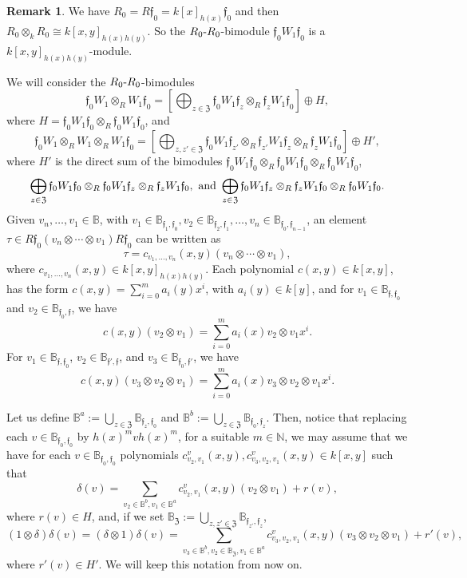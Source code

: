 \documentclass{article}
\theoremstyle{definition}
\newtheorem{remark}[theorem]{Remark}
\renewcommand{\frak}{\mathfrak}
\newcommand{\g}{\hbox{-}}
\newcommand{\hueca}[1]{\mathbb{#1}}
\begin{document}
\begin{remark}\label{R: descriptions of delta and}
 We have $R_0=R\frak{f}_0=k[x]_{h(x)}\frak{f}_0$ and then $R_0\otimes_kR_0\cong k[x,y]_{h(x)h(y)}$. So the $R_0\g R_0$-bimodule $\frak{f}_0W_1\frak{f}_0$ is a $k[x,y]_{h(x)h(y)}$-module.  

We will consider the $R_0\g R_0$-bimodules 
$$\frak{f}_0W_1\otimes_R W_1\frak{f}_0=[\bigoplus_{z\in \frak{Z}}\frak{f}_0W_1\frak{f}_z\otimes_R\frak{f}_zW_1\frak{f}_0]\oplus H, $$
where  $H=\frak{f}_0W_1\frak{f}_0\otimes_{R}\frak{f}_0W_1\frak{f}_0$,
 and 
$$\frak{f}_0W_1\otimes_RW_1\otimes_RW_1\frak{f}_0=
[\bigoplus_{z,z'\in \frak{Z}}\frak{f}_0W_1\frak{f}_{z'}\otimes_R\frak{f}_{z'}W_1\frak{f}_z\otimes_R \frak{f}_zW_1\frak{f}_0 ]\oplus H',$$
where $H'$ is the direct sum of the bimodules 
$
\frak{f}_0W_1\frak{f}_0\otimes_{R}\frak{f}_0W_1\frak{f}_0\otimes_{R}\frak{f}_0W_1\frak{f}_0$,  
$$\bigoplus_{z\in \frak{Z}}\frak{f}_0W_1\frak{f}_0\otimes_{R}\frak{f}_0W_1\frak{f}_z\otimes_R\frak{f}_zW_1\frak{f}_0,  
\hbox{ and }
\bigoplus_{z\in \frak{Z}}\frak{f}_0W_1\frak{f}_z\otimes_R\frak{f}_zW_1\frak{f}_0\otimes_{R}\frak{f}_0W_1\frak{f}_0.
$$ 
Given $v_n,\ldots,v_1\in \hueca{B}$, with $v_1\in \hueca{B}_{\frak{f}_1,\frak{f}_0}, v_2\in \hueca{B}_{\frak{f}_2,\frak{f}_1},\ldots, v_n\in \hueca{B}_{\frak{f}_0,\frak{f}_{n-1}}$, 
an element $\tau\in R\frak{f}_0(v_n\otimes\cdots\otimes v_1)R\frak{f}_0$ can be written as $$\tau=c_{v_1,\ldots,v_n}(x,y)(v_n\otimes\cdots\otimes v_1),$$
where  $c_{v_1,\ldots,v_n}(x,y)\in k[x,y]_{h(x)h(y)}$. Each polynomial $c(x,y)\in k[x,y]$, has the form $c(x,y)=\sum_{i=0}^ma_i(y)x^i$, with $a_i(y)\in k[y]$, and for $v_1\in \hueca{B}_{\frak{f},\frak{f}_0}$ and $v_2\in \hueca{B}_{\frak{f}_0,\frak{f}}$,  we have 
$$c(x,y)(v_2\otimes v_1)=\sum_{i=0}^ma_i(x)v_2\otimes v_1 x^i.$$
For $v_1\in \hueca{B}_{\frak{f},\frak{f}_0}$, $v_2\in \hueca{B}_{\frak{f}',\frak{f}}$, and $v_3\in \hueca{B}_{\frak{f}_0,\frak{f}'}$, we have 
$$c(x,y)(v_3\otimes v_2\otimes v_1)=\sum_{i=0}^ma_i(x)v_3\otimes v_2\otimes v_1 x^i.$$

Let us define  
$\hueca{B}^a:=\bigcup_{z\in \frak{Z}}
\hueca{B}_{\frak{f}_z,\frak{f}_0}$ and 
$\hueca{B}^b:=\bigcup_{z\in \frak{Z}}
\hueca{B}_{\frak{f}_0,\frak{f}_z}$. Then, notice that  replacing  each $v \in \hueca{B}_{\frak{f}_0,\frak{f}_0}$ by $h(x)^mvh(x)^m$, for a suitable $m\in \hueca{N}$, we may assume that we have  for each $v\in \hueca{B}_{\frak{f}_0,\frak{f}_0}$ polynomials $c^v_{v_2,v_1}(x,y), c^v_{v_3,v_2,v_1}(x,y)\in k[x,y]$ such that
$$\delta(v)=\sum_{v_2\in \hueca{B}^b, v_1\in \hueca{B}^a}c^v_{v_2,v_1}(x,y)(v_2\otimes v_1)+r(v),$$
where $r(v)\in H$, and, if we set $\hueca{B}_{\frak{Z}}:=\bigcup_{z,z'\in \frak{Z}}\hueca{B}_{\frak{f}_{z'},\frak{f}_z}$,  
$$(1\otimes \delta)\delta(v)=(\delta\otimes 1)\delta(v)
=
\sum_{v_3\in\hueca{B}^b, 
v_2\in \hueca{B}_{\frak{Z}}, 
v_1\in \hueca{B}^a }
c^v_{v_3,v_2,v_1}(x,y)(v_3\otimes v_2\otimes v_1)+r'(v) , 
$$
where $r'(v)\in H'$. We will keep this notation from now on. 
\end{remark}
\end{document}
